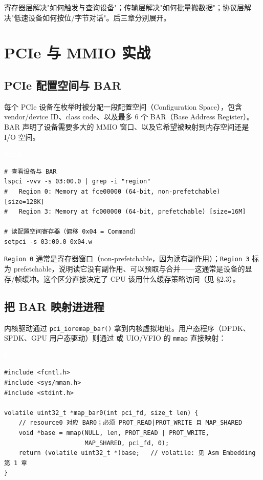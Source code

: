 \documentclass[12pt,a4paper,fontset=fandol]{ctexbook}
\newcommand{\clabel}{%
  \begin{tcolorbox}[enhanced,colback=cheadbg,colframe=cheadbg,
    arc=1mm,boxrule=0mm,left=6pt,right=6pt,top=2pt,bottom=2pt,
    halign=left,oversize]
    \textcolor{white}{\small\bfseries C}
  \end{tcolorbox}\vspace{-4pt}}
\newcommand{\bashlabel}{%
  \begin{tcolorbox}[enhanced,colback=black!80,colframe=black!80,
    arc=1mm,boxrule=0mm,left=6pt,right=6pt,top=2pt,bottom=2pt,
    halign=left,oversize]
    \textcolor{white}{\small\bfseries Shell}
  \end{tcolorbox}\vspace{-4pt}}
\newcommand{\Fn}[1]{\texttt{#1()}}
\begin{document}
寄存器层解决"如何触发与查询设备"；传输层解决"如何批量搬数据"；协议层解决"低速设备如何按位/字节对话"。后三章分别展开。

\chapter{PCIe 与 MMIO 实战}\label{ch:pcie-mmio}

\section{PCIe 配置空间与 BAR}\label{sec:pcie-config}

每个 PCIe 设备在枚举时被分配一段配置空间（Configuration Space），包含 vendor/device ID、class code、以及最多 6 个 BAR（Base Address Register）。BAR 声明了设备需要多大的 MMIO 窗口、以及它希望被映射到内存空间还是 I/O 空间。

\bashlabel
\begin{lstlisting}[style=bashstyle]
# 查看设备与 BAR
lspci -vvv -s 03:00.0 | grep -i "region"
#   Region 0: Memory at fce00000 (64-bit, non-prefetchable) [size=128K]
#   Region 3: Memory at fc000000 (64-bit, prefetchable) [size=16M]

# 读配置空间寄存器（偏移 0x04 = Command）
setpci -s 03:00.0 0x04.w
\end{lstlisting}

\texttt{Region 0} 通常是寄存器窗口（non-prefetchable，因为读有副作用）；\texttt{Region 3} 标为 prefetchable，说明读它没有副作用、可以预取与合并——这通常是设备的显存/帧缓冲。这个区分直接决定了 CPU 该用什么缓存策略访问（见 §2.3）。

\section{把 BAR 映射进进程}\label{sec:mmap-bar}

内核驱动通过 \Fn{pci\_ioremap\_bar} 拿到内核虚拟地址。用户态程序（DPDK、SPDK、GPU 用户态驱动）则通过  或 UIO/VFIO 的 \texttt{mmap} 直接映射：

\clabel
\begin{lstlisting}[style=cstyle]
#include <fcntl.h>
#include <sys/mman.h>
#include <stdint.h>

volatile uint32_t *map_bar0(int pci_fd, size_t len) {
    // resource0 对应 BAR0；必须 PROT_READ|PROT_WRITE 且 MAP_SHARED
    void *base = mmap(NULL, len, PROT_READ | PROT_WRITE,
                      MAP_SHARED, pci_fd, 0);
    return (volatile uint32_t *)base;   // volatile: 见 Asm Embedding 第 1 章
}
\end{lstlisting}
\end{document}
